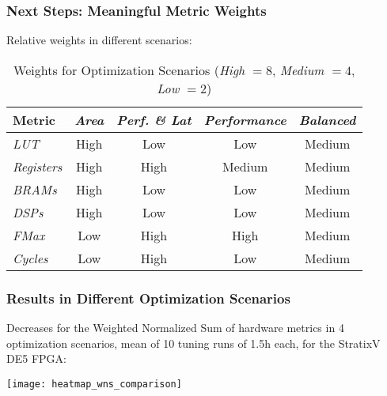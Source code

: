 \documentclass[10pt, compress, aspectratio=169, xcolor=table]{beamer}
\begin{document}
\begin{frame}[fragile]
    \frametitle{Next Steps: Meaningful Metric Weights}

    Relative weights in \alert{different scenarios}:

    \begin{table}[htpb]
    \centering
    \begin{tabular}{@{}lcccc@{}}
        \toprule
        Metric & \textit{Area} & \textit{Perf. \& Lat} & \textit{Performance} & \textit{Balanced} \\ \midrule
        \textit{LUT} & \cellcolor[HTML]{9B94B6} High & \cellcolor[HTML]{DD9583} Low & \cellcolor[HTML]{DD9583} Low & \cellcolor[HTML]{E3DBB3} Medium \\
        \textit{Registers} & \cellcolor[HTML]{9B94B6} High & \cellcolor[HTML]{9B94B6} High & \cellcolor[HTML]{E3DBB3} Medium & \cellcolor[HTML]{E3DBB3} Medium \\
        \textit{BRAMs} & \cellcolor[HTML]{9B94B6} High & \cellcolor[HTML]{DD9583} Low & \cellcolor[HTML]{DD9583} Low & \cellcolor[HTML]{E3DBB3} Medium \\
        \textit{DSPs} & \cellcolor[HTML]{9B94B6} High & \cellcolor[HTML]{DD9583} Low & \cellcolor[HTML]{DD9583} Low & \cellcolor[HTML]{E3DBB3} Medium \\
        \textit{FMax} & \cellcolor[HTML]{DD9583} Low & \cellcolor[HTML]{9B94B6} High & \cellcolor[HTML]{9B94B6} High & \cellcolor[HTML]{E3DBB3} Medium \\
        \textit{Cycles} & \cellcolor[HTML]{DD9583} Low & \cellcolor[HTML]{9B94B6} High & \cellcolor[HTML]{DD9583} Low & \cellcolor[HTML]{E3DBB3} Medium \\ \bottomrule
    \end{tabular}
    \caption{Weights for Optimization Scenarios (\textit{High} $= 8$, \textit{Medium} $= 4$, \textit{Low} $= 2$)}
    \label{tab:scenarios}
    \end{table}
\end{frame}

\begin{frame}
    \frametitle{Results in Different Optimization Scenarios}
    Decreases for the \alert{Weighted Normalized Sum} of
    hardware metrics in \alert{4 optimization scenarios}, mean of \alert{10
    tuning runs} of \alert{1.5h each}, for the \alert{StratixV DE5} FPGA:

    \begin{center}
        \texttt{[image: heatmap\_wns\_comparison]}
    \end{center}
\end{frame}
\end{document}
